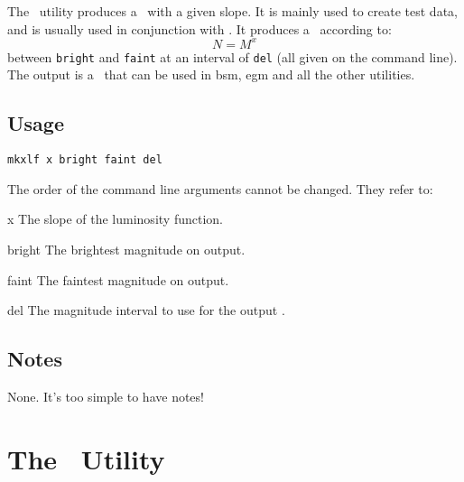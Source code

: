 \documentclass[11pt,twoside]{article}
\begin{document}
The \mkxlf\ utility produces a \lf\ with a given slope. It is mainly used to
create test data, and is usually used in conjunction with \mknlf. It produces
a \lf\ according to:
\[
N = M^{x} 
\]
between {\tt bright} and {\tt faint} at an interval of {\tt del} (all given
on the command line). The output is a \lf\ that can be used in {\sc bsm}, 
{\sc egm} and all the other utilities.

\subsection*{Usage}

\begin{verbatim}
mkxlf x bright faint del
\end{verbatim}

\nin
The order of the command line arguments cannot be changed. They refer to:
\medskip

\begin{clo}{x}
The slope of the luminosity function.
\end{clo}

\begin{clo}{bright}
The brightest magnitude on output.
\end{clo}

\begin{clo}{faint}
The faintest magnitude on output.
\end{clo}

\begin{clo}{del}
The magnitude interval to use for the output \lf.
\end{clo}

\subsection*{Notes}

None. It's too simple to have notes!


\newpage
\section{The \egmcmp\ Utility}
\end{document}
